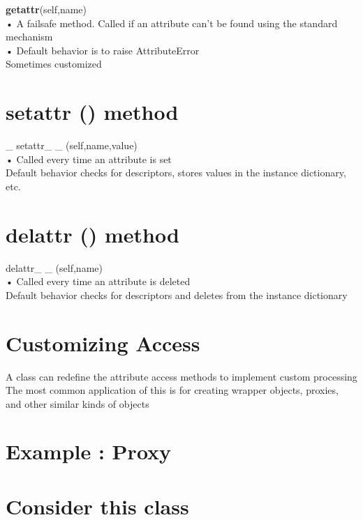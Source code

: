 \documentclass[
  letterpaper,
  DIV=11,
  numbers=noendperiod]{scrreprt}
\begin{document}
\textbf{getattr}(self,name)\\
• A failsafe method. Called if an attribute can't be found using the
standard mechanism\\
• Default behavior is to raise AttributeError\\
Sometimes customized


\chapter{setattr () method}\label{setattr-method}

\_ setattr\_ \_ (self,name,value)\\
• Called every time an attribute is set\\
Default behavior checks for descriptors, stores values in the instance
dictionary, etc.


\chapter{delattr () method}\label{delattr-method}

delattr\_ \_ (self,name)\\
• Called every time an attribute is deleted\\
Default behavior checks for descriptors and deletes from the instance
dictionary


\chapter{Customizing Access}\label{customizing-access}

A class can redefine the attribute access methods to implement custom
processing\\
The most common application of this is for creating wrapper objects,
proxies, and other similar kinds of objects


\chapter{Example : Proxy}\label{example-proxy}


\chapter{Consider this class}\label{consider-this-class}
\end{document}
